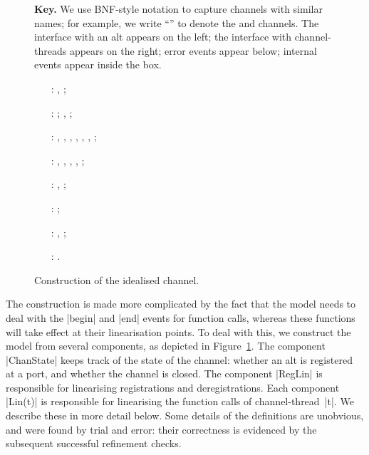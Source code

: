 \begin{figure}

\uncspMid
\textbf{Key.}  We use BNF-style notation to capture
channels with similar names; for example, we write
``\m{}'' to denote the  and
 channels.  The interface with an alt appears on the left; the
interface with channel-threads appears on the right; error events appear
below; internal events appear inside the box. 

\raggedright
%
\begin{itemize}
\item[\inCircle{1}:]  \m{}\m{}, 
  \m{}\m{};

\item[\inCircle{2}:] \m{};
  \m{}, ;

\item[\inCircle{3}:] , ,
  , , , ,
  ;

\item[\inCircle{4}:] \m{},
  \m{}, \m{},
  \m{}, \m{};

\item[\inCircle{5}:] \m{},
  \m{};

\item[\inCircle{6}:] \m{};

\item[\inCircle{7}:] ,
  \m{};

\item[\inCircle{8}:] \m{}.
\end{itemize}
\caption{Construction of the idealised channel.  \label{fig:idealised-chan}}
\end{figure}

\cspMid


The construction is made more complicated by the fact that the model needs to
deal with the |begin| and |end| events for function calls, whereas these
functions will take effect at their linearisation points.  To deal with this,
we construct the model from several components, as depicted in
Figure~\ref{fig:idealised-chan}.  The component |ChanState| keeps track of the
state of the channel: whether an alt is registered at a port, and whether the
channel is closed.  The component |RegLin| is responsible for linearising
registrations and deregistrations.  Each component |Lin(t)| is responsible for
linearising the function calls of channel-thread~|t|.  We describe these in
more detail below.  Some details of the definitions are unobvious, and were
found by trial and error: their correctness is evidenced by the subsequent
successful refinement checks.

